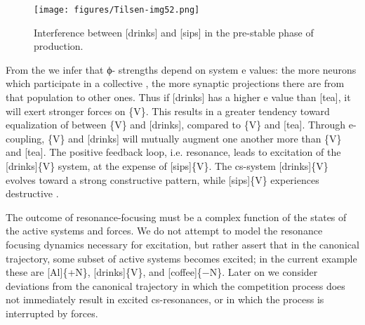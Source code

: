   
\begin{figure}
\texttt{[image: figures/Tilsen-img52.png]}
\caption{Interference between [drinks] and [sips] in the pre-stable phase of production.}
\label{fig:4:2}
\end{figure}
 

From the  we infer that ϕ{}- strengths depend on system e values: the more neurons which participate in a collective , the more synaptic projections there are from that population to other ones. Thus if [drinks] has a higher e value than [tea], it will exert stronger forces on \{V\}. This results in a greater tendency toward equalization of  between \{V\} and [drinks], compared to \{V\} and [tea]. Through e-coupling, \{V\} and [drinks] will mutually augment one another more than \{V\} and [tea]. The positive feedback loop, i.e. resonance, leads to excitation of the [drinks]\{V\} system, at the expense of [sips]\{V\}. The cs-system [drinks]\{V\} evolves toward a strong constructive  pattern, while [sips]\{V\} experiences destructive .\largerpage

The outcome of resonance-focusing must be a complex function of the states of the active systems and  forces. We do not attempt to model the resonance focusing dynamics necessary for excitation, but rather assert that in the canonical trajectory, some subset of active systems becomes excited; in the current example these are [Al]\{+N\}, [drinks]\{V\}, and [coffee]\{−N\}. Later on we consider deviations from the canonical trajectory in which the competition process does not immediately result in excited cs-resonances, or in which the process is interrupted by  forces.

